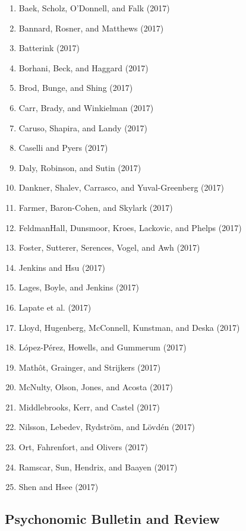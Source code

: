 \documentclass[english,man]{apa6}
\providecommand{\tightlist}{%
  \setlength{\itemsep}{0pt}\setlength{\parskip}{0pt}}
\theoremstyle{definition}
\theoremstyle{definition}
\theoremstyle{definition}
\theoremstyle{remark}
\begin{document}
\begin{enumerate}
\def\labelenumi{\arabic{enumi})}
\tightlist
\item
  Baek, Scholz, O'Donnell, and Falk (2017)
\item
  Bannard, Rosner, and Matthews (2017)
\item
  Batterink (2017)
\item
  Borhani, Beck, and Haggard (2017)
\item
  Brod, Bunge, and Shing (2017)
\item
  Carr, Brady, and Winkielman (2017)
\item
  Caruso, Shapira, and Landy (2017)
\item
  Caselli and Pyers (2017)
\item
  Daly, Robinson, and Sutin (2017)
\item
  Dankner, Shalev, Carrasco, and Yuval-Greenberg (2017)
\item
  Farmer, Baron-Cohen, and Skylark (2017)
\item
  FeldmanHall, Dunsmoor, Kroes, Lackovic, and Phelps (2017)
\item
  Foster, Sutterer, Serences, Vogel, and Awh (2017)
\item
  Jenkins and Hsu (2017)
\item
  Lages, Boyle, and Jenkins (2017)
\item
  Lapate et al. (2017)
\item
  Lloyd, Hugenberg, McConnell, Kunstman, and Deska (2017)
\item
  López-Pérez, Howells, and Gummerum (2017)
\item
  Mathôt, Grainger, and Strijkers (2017)
\item
  McNulty, Olson, Jones, and Acosta (2017)
\item
  Middlebrooks, Kerr, and Castel (2017)
\item
  Nilsson, Lebedev, Rydström, and Lövdén (2017)
\item
  Ort, Fahrenfort, and Olivers (2017)
\item
  Ramscar, Sun, Hendrix, and Baayen (2017)
\item
  Shen and Hsee (2017)
\end{enumerate}

\subsection{Psychonomic Bulletin and
Review}\label{psychonomic-bulletin-and-review}
\end{document}
